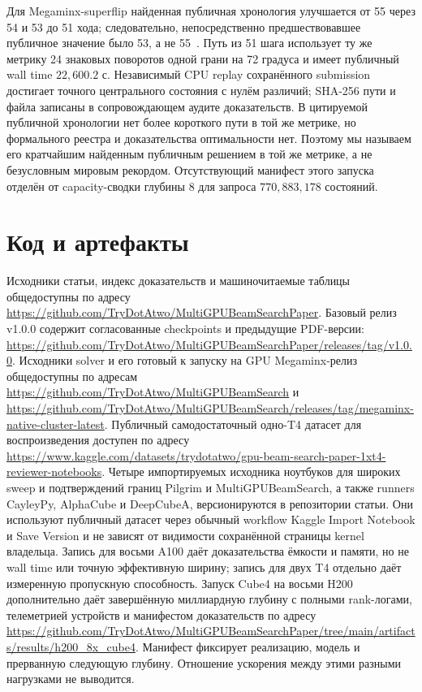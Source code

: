 \documentclass[10pt,twocolumn]{article}
\begin{document}
Для Megaminx-superflip найденная публичная хронология улучшается от 55 через 54
и 53 до 51 хода; следовательно, непосредственно предшествовавшее публичное
значение было 53, а не 55~\cite{megaminxsuperflip53,megaminxsuperflip51}.
Путь из 51 шага использует ту же метрику 24 знаковых поворотов одной грани на
72 градуса и имеет публичный wall time $22{,}600.2$ с. Независимый CPU replay
сохранённого submission достигает точного центрального состояния с нулём различий;
SHA-256 пути и файла записаны в сопровождающем аудите доказательств.
В цитируемой публичной хронологии нет более короткого пути в той же метрике, но
формального реестра и доказательства оптимальности нет. Поэтому мы называем его
кратчайшим найденным публичным решением в той же метрике, а не безусловным
мировым рекордом. Отсутствующий манифест этого запуска отделён от capacity-сводки
глубины 8 для запроса $770{,}883{,}178$ состояний.

\section{Код и артефакты}
Исходники статьи, индекс доказательств и машиночитаемые таблицы общедоступны по
адресу \url{https://github.com/TryDotAtwo/MultiGPUBeamSearchPaper}. Базовый
релиз v1.0.0 содержит согласованные checkpoints и предыдущие PDF-версии:
\url{https://github.com/TryDotAtwo/MultiGPUBeamSearchPaper/releases/tag/v1.0.0}.
Исходники solver и его готовый к запуску на GPU Megaminx-релиз общедоступны по
адресам \url{https://github.com/TryDotAtwo/MultiGPUBeamSearch} и
\url{https://github.com/TryDotAtwo/MultiGPUBeamSearch/releases/tag/megaminx-native-cluster-latest}.
Публичный самодостаточный одно-T4 датасет для воспроизведения доступен по адресу
\url{https://www.kaggle.com/datasets/trydotatwo/gpu-beam-search-paper-1xt4-reviewer-notebooks}.
Четыре импортируемых исходника ноутбуков для широких sweep и подтверждений
границ Pilgrim и MultiGPUBeamSearch, а также runners CayleyPy, AlphaCube и
DeepCubeA, версионируются в репозитории статьи. Они используют публичный датасет
через обычный workflow Kaggle Import Notebook и Save Version и не зависят от
видимости сохранённой страницы kernel владельца.
Запись для восьми A100 даёт доказательства ёмкости и памяти, но не wall time или
точную эффективную ширину; запись для двух T4 отдельно даёт измеренную
пропускную способность. Запуск Cube4 на восьми H200 дополнительно даёт
завершённую миллиардную глубину с полными rank-логами, телеметрией устройств
и манифестом доказательств по адресу
\url{https://github.com/TryDotAtwo/MultiGPUBeamSearchPaper/tree/main/artifacts/results/h200_8x_cube4}.
Манифест фиксирует реализацию, модель и прерванную следующую глубину.
Отношение ускорения между этими разными нагрузками не выводится.
\end{document}
